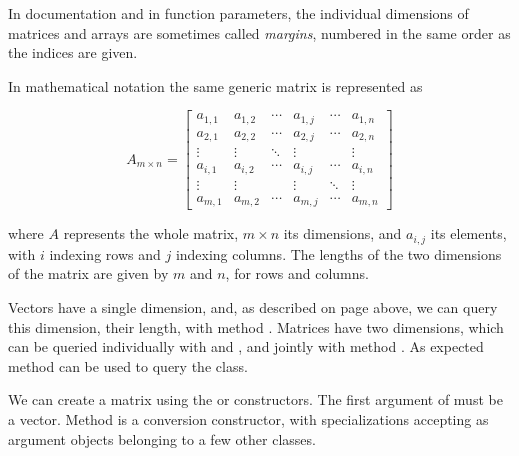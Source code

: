 \documentclass[krantz2]{krantz}\usepackage{knitr}
\begin{document}
\begin{warningbox}
  In \Rlang documentation and in function parameters, the individual dimensions of matrices and arrays are sometimes called \emph{margins}, numbered in the same order as the indices are given.
\end{warningbox}

In mathematical notation the same generic matrix is represented as

\begin{equation*}
  A_{m\times n} =
  \begin{bmatrix}
    a_{1,1} & a_{1,2} & \cdots & a_{1,j} & \cdots & a_{1,n}\\
    a_{2,1} & a_{2,2} & \cdots & a_{2,j} & \cdots & a_{2,n}\\
    \vdots & \vdots & \ddots & \vdots &        & \vdots \\
   a_{i,1} & a_{i,2} & \cdots & a_{i,j} & \cdots & a_{i,n}\\
     \vdots & \vdots &      & \vdots &  \ddots & \vdots \\
   a_{m,1} & a_{m,2} & \cdots & a_{m,j} & \cdots & a_{m,n}
  \end{bmatrix}
\end{equation*}

where $A$ represents the whole matrix, $m \times n$ its dimensions, and $a_{i,j}$ its elements, with $i$ indexing rows and $j$ indexing columns. The lengths of the two dimensions of the matrix are given by $m$ and $n$, for rows and columns.

Vectors have a single dimension, and, as described on page \pageref{par:calc:vectors:diag} above, we can query this dimension, their length, with method . Matrices have two dimensions, which can be queried individually with  and , and jointly with method . As expected method  can be used to query the class.

We can create a matrix using the  or  constructors. The first argument of  must be a vector. Method  is a conversion constructor, with specializations accepting as argument objects belonging to a few other classes.
\end{document}
